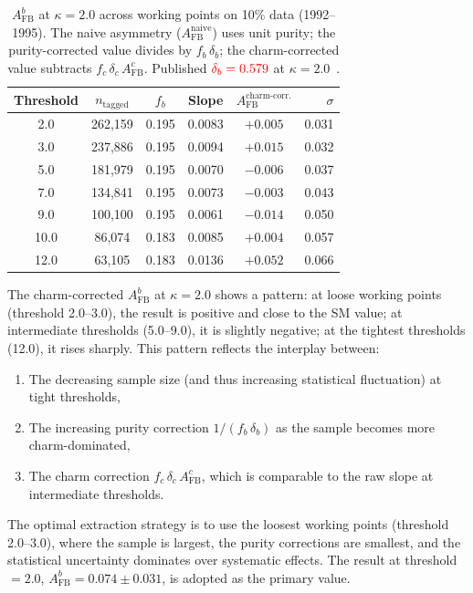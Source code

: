 \documentclass[11pt,a4paper]{article}
\newcommand{\external}[1]{\textcolor{red}{#1}}
\begin{document}
\begin{table}[htbp]
\centering
\caption{$A_\text{FB}^b$ at $\kappa = 2.0$ across working points
on 10\% data (1992--1995). The naive asymmetry
($A_\text{FB}^\text{naive}$) uses unit purity; the
purity-corrected value divides by $f_b\,\delta_b$; the
charm-corrected value subtracts $f_c\,\delta_c\,A_\text{FB}^c$.
Published $\external{\delta_b = 0.579}$ at $\kappa = 2.0$~\cite{LEP:EWWG:2005}.}
\label{tbl:afb_full_kappa}
\begin{tabular}{cccccr}
\toprule
Threshold & $n_\text{tagged}$ & $f_b$ & Slope &
$A_\text{FB}^\text{charm-corr.}$ & $\sigma$ \\
\midrule
2.0  & 262,159 & 0.195 & 0.0083 & $+0.005$ & 0.031 \\
3.0  & 237,886 & 0.195 & 0.0094 & $+0.015$ & 0.032 \\
5.0  & 181,979 & 0.195 & 0.0070 & $-0.006$ & 0.037 \\
7.0  & 134,841 & 0.195 & 0.0073 & $-0.003$ & 0.043 \\
9.0  & 100,100 & 0.195 & 0.0061 & $-0.014$ & 0.050 \\
10.0 &  86,074 & 0.183 & 0.0085 & $+0.004$ & 0.057 \\
12.0 &  63,105 & 0.183 & 0.0136 & $+0.052$ & 0.066 \\
\bottomrule
\end{tabular}
\end{table}

The charm-corrected $A_\text{FB}^b$ at $\kappa = 2.0$ shows a
pattern: at loose working points (threshold 2.0--3.0), the
result is positive and close to the SM value; at intermediate
thresholds (5.0--9.0), it is slightly negative; at the tightest
thresholds (12.0), it rises sharply.
This pattern reflects the interplay between:
\begin{enumerate}
\item The decreasing sample size (and thus increasing statistical
  fluctuation) at tight thresholds,
\item The increasing purity correction $1/(f_b\,\delta_b)$ as the
  sample becomes more charm-dominated,
\item The charm correction $f_c\,\delta_c\,A_\text{FB}^c$, which
  is comparable to the raw slope at intermediate thresholds.
\end{enumerate}

The optimal extraction strategy is to use the loosest working
points (threshold 2.0--3.0), where the sample is largest, the
purity corrections are smallest, and the statistical uncertainty
dominates over systematic effects.
The result at threshold $= 2.0$,
$A_\text{FB}^b = 0.074 \pm 0.031$, is adopted as the primary
value.
\end{document}
